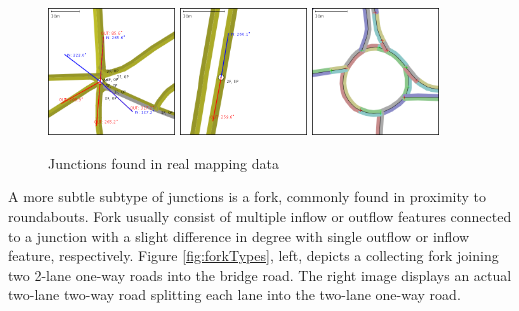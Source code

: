 \begin{figure}[h]
    \vspace{1.5em}
    \caption{Junctions found in real mapping data}
    \label{fig:junctionTypes}
    \centering
    \includegraphics[width=0.3\textwidth]{figs/junction/junction_5_roads.png}
    \hspace{0.2em}
    \includegraphics[width=0.3\textwidth]{figs/junction/junction_two_roads.png}
    \hspace{0.2em}
    \includegraphics[width=0.3\textwidth]{figs/junction/roundabout.png}
    \vspace{1.5em}
\end{figure}

A more subtle subtype of junctions is a fork, commonly found in proximity to roundabouts. Fork usually consist of multiple inflow or outflow features connected to a junction with a slight difference in degree with single outflow or inflow feature, respectively. Figure \ref{fig:forkTypes}, left, depicts a collecting fork joining two 2-lane one-way roads into the bridge road. The right image displays an actual two-lane two-way road splitting each lane into the two-lane one-way road.

